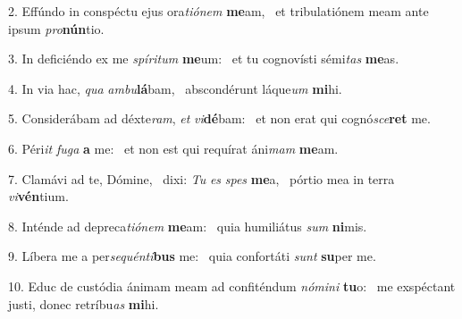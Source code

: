 2. Effúndo in conspéctu ejus ora\textit{ti}\textit{ó}\textit{nem} \textbf{me}am, \ast\  et tribulatiónem meam ante ipsum \textit{pro}\textbf{nún}tio.\

3. In deficiéndo ex me \textit{spí}\textit{ri}\textit{tum} \textbf{me}um: \ast\  et tu cognovísti sémi\textit{tas} \textbf{me}as.\

4. In via hac, \textit{qua} \textit{am}\textit{bu}\textbf{lá}bam, \ast\  abscondérunt láque\textit{um} \textbf{mi}hi.\

5. Considerábam ad déxte\textit{ram}, \textit{et} \textit{vi}\textbf{dé}bam: \ast\  et non erat qui cognó\textit{sce}\textbf{ret} me.\

6. Péri\textit{it} \textit{fu}\textit{ga} \textbf{a} me: \ast\  et non est qui requírat áni\textit{mam} \textbf{me}am.\

7. Clamávi ad te, Dómine, \dag\  dixi: \textit{Tu} \textit{es} \textit{spes} \textbf{me}a, \ast\  pórtio mea in terra \textit{vi}\textbf{vén}tium.\

8. Inténde ad depreca\textit{ti}\textit{ó}\textit{nem} \textbf{me}am: \ast\  quia humiliátus \textit{sum} \textbf{ni}mis.\

9. Líbera me a per\textit{se}\textit{quén}\textit{ti}\textbf{bus} me: \ast\  quia confortáti \textit{sunt} \textbf{su}per me.\

10. Educ de custódia ánimam meam ad confiténdum \textit{nó}\textit{mi}\textit{ni} \textbf{tu}o: \ast\  me exspéctant justi, donec retríbu\textit{as} \textbf{mi}hi.\

